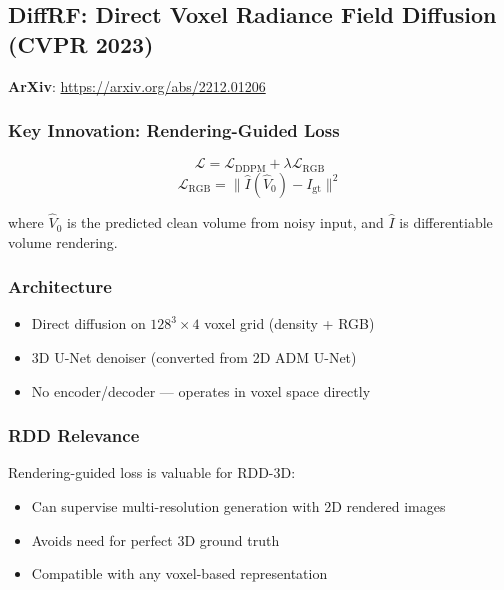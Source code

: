 \documentclass[11pt, a4paper]{article}
\begin{document}
\subsection{DiffRF: Direct Voxel Radiance Field Diffusion (CVPR 2023)}

\textbf{ArXiv}: \url{https://arxiv.org/abs/2212.01206}

\subsubsection{Key Innovation: Rendering-Guided Loss}

\begin{equation}
    \mathcal{L} = \mathcal{L}_{\text{DDPM}} + \lambda \mathcal{L}_{\text{RGB}}
\end{equation}
\begin{equation}
    \mathcal{L}_{\text{RGB}} = \|\hat{I}(\hat{V}_0) - I_{\text{gt}}\|^2
\end{equation}

where $\hat{V}_0$ is the predicted clean volume from noisy input, and $\hat{I}$ is differentiable volume rendering.

\subsubsection{Architecture}

\begin{itemize}
    \item Direct diffusion on $128^3 \times 4$ voxel grid (density + RGB)
    \item 3D U-Net denoiser (converted from 2D ADM U-Net)
    \item No encoder/decoder --- operates in voxel space directly
\end{itemize}

\subsubsection{RDD Relevance}

Rendering-guided loss is valuable for RDD-3D:
\begin{itemize}
    \item Can supervise multi-resolution generation with 2D rendered images
    \item Avoids need for perfect 3D ground truth
    \item Compatible with any voxel-based representation
\end{itemize}
\end{document}
